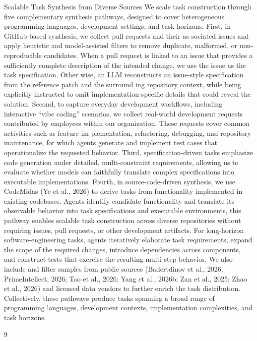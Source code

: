 \documentclass[
  10
]{article}
\begin{document}
Scalable Task Synthesis from Diverse Sources We scale task construction
through five complementary synthesis pathways, designed to cover
heterogeneous programming languages, development settings, and task
horizons. First, in GitHub-based synthesis, we collect pull requests and
their as sociated issues and apply heuristic and model-assisted filters
to remove duplicate, malformed, or non-reproducible candidates. When a
pull request is linked to an issue that provides a sufficiently complete
description of the intended change, we use the issue as the task
specification. Other wise, an LLM reconstructs an issue-style
specification from the reference patch and the surround ing repository
context, while being explicitly instructed to omit
implementation-specific details that could reveal the solution. Second,
to capture everyday development workflows, including interactive ``vibe
coding'' scenarios, we collect real-world development requests
contributed by employees within our organization. These requests cover
common activities such as feature im plementation, refactoring,
debugging, and repository maintenance, for which agents generate and
implement test cases that operationalize the requested behavior. Third,
specification-driven tasks emphasize code generation under detailed,
multi-constraint requirements, allowing us to evaluate whether models
can faithfully translate complex specifications into executable
implementations. Fourth, in source-code-driven synthesis, we use
CodeMidas (Ye et al., 2026) to derive tasks from functionality
implemented in existing codebases. Agents identify candidate
functionality and translate its observable behavior into task
specifications and executable environments, this pathway enables
scalable task construction across diverse repositories without requiring
issues, pull requests, or other development artifacts. For long-horizon
software-engineering tasks, agents iteratively elaborate task
requirements, expand the scope of the required changes, introduce
dependencies across components, and construct tests that exercise the
resulting multi-step behavior. We also include and filter samples from
public sources (Badertdinov et al., 2026; PrimeIntellect, 2026; Tao et
al., 2026; Yang et al., 2026b; Zan et al., 2025; Zhao et al., 2026) and
licensed data vendors to further enrich the task distribution.
Collectively, these pathways produce tasks spanning a broad range of
programming languages, development contexts, implementation
complexities, and task horizons.

9
\end{document}
